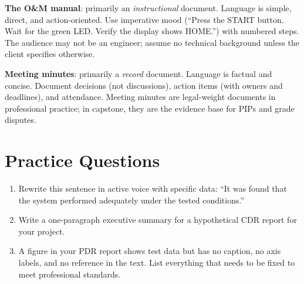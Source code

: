 \textbf{The O\&M manual}: primarily an \emph{instructional} document. Language is simple, direct, and action-oriented. Use imperative mood (``Press the START button. Wait for the green LED. Verify the display shows HOME.'') with numbered steps. The audience may not be an engineer; assume no technical background unless the client specifies otherwise.

\textbf{Meeting minutes}: primarily a \emph{record} document. Language is factual and concise. Document decisions (not discussions), action items (with owners and deadlines), and attendance. Meeting minutes are legal-weight documents in professional practice; in capstone, they are the evidence base for PIPs and grade disputes.


\section{Practice Questions}
\begin{enumerate}[leftmargin=1.5em]
\item Rewrite this sentence in active voice with specific data: ``It was found that the system performed adequately under the tested conditions.''
\item Write a one-paragraph executive summary for a hypothetical CDR report for your project.
\item A figure in your PDR report shows test data but has no caption, no axis labels, and no reference in the text. List everything that needs to be fixed to meet professional standards.
\end{enumerate}


